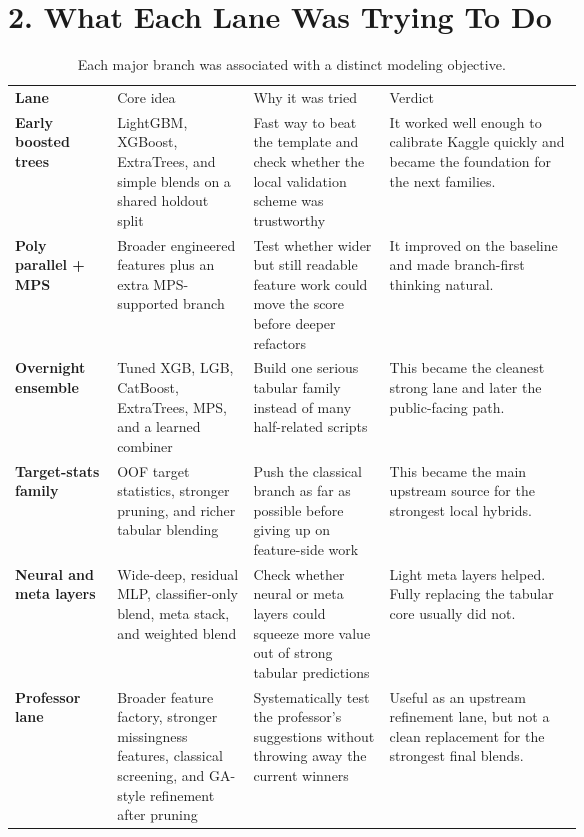 \section*{2. What Each Lane Was Trying To Do}

\begin{table}[H]
    \centering
    \small
    \begin{tabularx}{\linewidth}{>{\bfseries}p{0.18\linewidth} >{\raggedright\arraybackslash}p{0.24\linewidth} >{\raggedright\arraybackslash}p{0.24\linewidth} X}
        \rowcolor{tealaccent!14}
        Lane & Core idea & Why it was tried & Verdict \\
        Early boosted trees & LightGBM, XGBoost, ExtraTrees, and simple blends on a shared holdout split & Fast way to beat the template and check whether the local validation scheme was trustworthy & It worked well enough to calibrate Kaggle quickly and became the foundation for the next families. \\
        Poly parallel + MPS & Broader engineered features plus an extra MPS-supported branch & Test whether wider but still readable feature work could move the score before deeper refactors & It improved on the baseline and made branch-first thinking natural. \\
        Overnight ensemble & Tuned XGB, LGB, CatBoost, ExtraTrees, MPS, and a learned combiner & Build one serious tabular family instead of many half-related scripts & This became the cleanest strong lane and later the public-facing path. \\
        Target-stats family & OOF target statistics, stronger pruning, and richer tabular blending & Push the classical branch as far as possible before giving up on feature-side work & This became the main upstream source for the strongest local hybrids. \\
        Neural and meta layers & Wide-deep, residual MLP, classifier-only blend, meta stack, and weighted blend & Check whether neural or meta layers could squeeze more value out of strong tabular predictions & Light meta layers helped. Fully replacing the tabular core usually did not. \\
        Professor lane & Broader feature factory, stronger missingness features, classical screening, and GA-style refinement after pruning & Systematically test the professor's suggestions without throwing away the current winners & Useful as an upstream refinement lane, but not a clean replacement for the strongest final blends. \\
    \end{tabularx}
    \caption{Each major branch was associated with a distinct modeling objective.}
\end{table}

